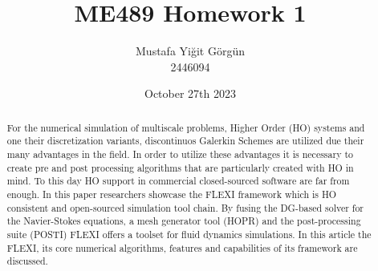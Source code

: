 \documentclass{article}
\title{ME489 Homework 1}
\author{Mustafa Yiğit Görgün \\ 2446094}
\date{October 27th 2023}
\begin{document}
\maketitle
\begin{abstract}
For the numerical simulation of multiscale problems, Higher Order (HO) systems and one their discretization variants, discontinuos Galerkin Schemes are utilized due their many advantages in the field. In order to utilize these advantages it is necessary to create pre and post processing algorithms that are particularly created with HO in mind. To this day HO support in commercial closed-sourced software are far from enough. In this paper researchers showcase the FLEXI framework which is HO consistent and open-sourced simulation tool chain. By fusing the DG-based solver for the Navier-Stokes equations, a mesh generator tool (HOPR) and the post-processing suite (POSTI) FLEXI offers a toolset for fluid dynamics simulations. In this article the FLEXI, its core numerical algorithms, features and capabilities of its framework are discussed. 
\end{abstract}
\end{document}
